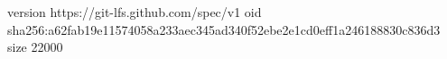 version https://git-lfs.github.com/spec/v1
oid sha256:a62fab19e11574058a233aec345ad340f52ebe2e1cd0eff1a246188830c836d3
size 22000
